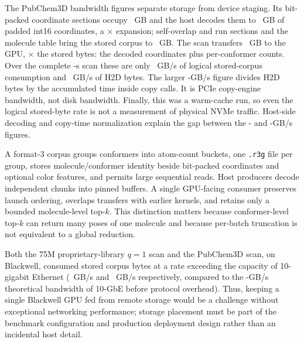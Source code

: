 The PubChem3D bandwidth figures separate storage from device staging. Its
bit-packed coordinate sections occupy \PubchemStoredCoordinateGigabytes~GB and
the host decodes them to \PubchemDecodedCoordinateGigabytes~GB of padded int16
coordinates, a \PubchemCoordinateDecodeRatio$\times$ expansion; self-overlap
and run sections and the molecule table bring the stored corpus to
\PubchemStoredGigabytes~GB. The scan transfers
\PubchemHtwoDTransferredGigabytes~GB to the GPU,
\PubchemHtwoDToStoredByteRatio$\times$ the stored bytes: the decoded
coordinates plus per-conformer counts. Over the complete
\DfiveWallSeconds-s scan these are only \PubchemStoredGigabytesPerSecond~GB/s
of logical stored-corpus consumption and
\PubchemHtwoDWholeRunGigabytesPerSecond~GB/s of H2D bytes. The larger
\PubchemHtwoDActiveGigabytesPerSecond-GB/s figure divides H2D bytes by the
accumulated time inside copy calls. It is PCIe copy-engine bandwidth, not disk
bandwidth. Finally, this was a warm-cache run, so even the logical stored-byte
rate is not a measurement of physical NVMe traffic. Host-side decoding and
copy-time normalization explain the gap between the
\PubchemHtwoDActiveGigabytesPerSecond- and
\PubchemStoredGigabytesPerSecond-GB/s figures.

A format-3 corpus groups conformers into atom-count buckets, one
\texttt{.r3g} file per group, stores molecule/conformer identity beside
bit-packed coordinates and optional color features, and permits large
sequential reads. Host producers decode independent
chunks into pinned buffers. A single GPU-facing consumer preserves launch
ordering, overlaps transfers with earlier kernels, and retains only a bounded
molecule-level top-$k$. This distinction matters because conformer-level top-$k$
can return many poses of one molecule and because per-batch truncation is not
equivalent to a global reduction.

Both the 75M proprietary-library $q{=}1$ scan and the PubChem3D scan, on Blackwell,
consumed stored corpus bytes at a rate exceeding the capacity of 10-gigabit Ethernet
(\ThreeCrStoredGigabytesPerSecond~GB/s and \PubchemStoredGigabytesPerSecond~GB/s respectively,
compared to the \TenGigETheoreticalGigabytesPerSecond-GB/s theoretical bandwidth of 10-GbE before
protocol overhead). Thus, keeping a single Blackwell GPU fed from
remote storage would be a challenge without exceptional networking performance;
storage placement must be part of the benchmark configuration and production deployment design rather
than an incidental host detail.

